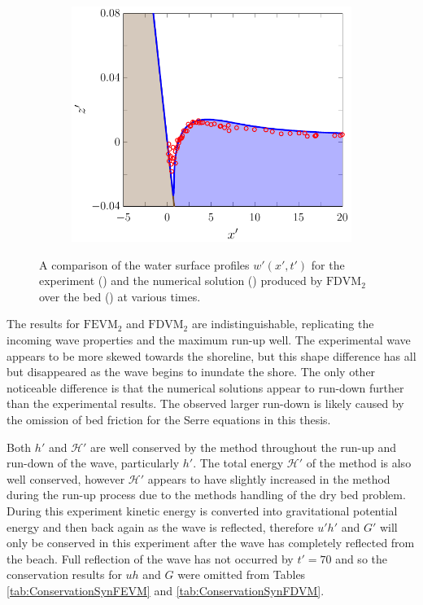 \begin{figure}
\begin{subfigure}{0.5\textwidth}
		\vspace{0.5cm}
	\end{subfigure}
	\begin{subfigure}{0.5\textwidth}
		\includegraphics[width=\textwidth]{./chp6/figures/Experiment/Synolakis/H0p0185/FDVM/70s.pdf}
		\vspace{0.5cm}
	\end{subfigure}
	\caption{A comparison of the water surface profiles $w'(x',t')$ for the experiment () and the numerical solution () produced by $\text{FDVM}_2$ over the bed () at various times.}
	\label{fig:SynolakisFDVMNoBreak}
\end{figure}

The results for $\text{FEVM}_2$ and $\text{FDVM}_2$ are indistinguishable, replicating the incoming wave properties and the maximum run-up well. The experimental wave appears to be more skewed towards the shoreline, but this shape difference has all but disappeared as the wave begins to inundate the shore. The only other noticeable difference is that the numerical solutions appear to run-down further than the experimental results. The observed larger run-down is likely caused by the omission of bed friction for the Serre equations in this thesis.

Both $h'$ and $\mathcal{H}'$ are well conserved by the method throughout the run-up and run-down of the wave, particularly $h'$. The total energy $\mathcal{H}'$ of the method is also well conserved, however $\mathcal{H}'$ appears to have slightly increased in the method during the run-up process due to the methods handling of the dry bed problem. During this experiment kinetic energy is converted into gravitational potential energy and then back again as the wave is reflected, therefore $u'h'$ and $G'$ will only be conserved in this experiment after the wave has completely reflected from the beach. Full reflection of the wave has not occurred by $t'=70$ and so the conservation results for $uh$ and $G$ were omitted from Tables \ref{tab:ConservationSynFEVM} and \ref{tab:ConservationSynFDVM}.

